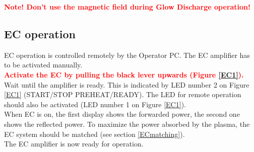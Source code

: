 \documentclass[fleqn,a4paper,20pt]{article}
\begin{document}
\begin{center}
	\textcolor{red}{\textbf{Note! Don’t use the magnetic field during Glow Discharge operation!}}\\
\end{center}
\vspace{0.2cm}


\begin{minipage}{.63\textwidth}

\subsection{EC operation}


EC operation is controlled remotely by the Operator PC. The EC amplifier has to be activated manually.\\

\textcolor{red}{\textbf{Activate the EC by pulling the black lever upwards (Figure \ref{EC1}).}}\\

Wait until the amplifier is ready. This is indicated by LED number 2 on Figure \ref{EC1} (START/STOP PREHEAT/READY). The LED for remote operation should also be activated (LED number 1 on Figure \ref{EC1}).\\

When EC is on, the first display shows the forwarded power, the second one shows the reflected power. To maximize the power absorbed by the plasma, the EC system should be matched (see section \ref{ECmatching}).\\

The EC amplifier is now ready for operation. 

	
\end{minipage}
\begin{minipage}{.02\textwidth}
	$\ $\\
\end{minipage}
\end{document}
